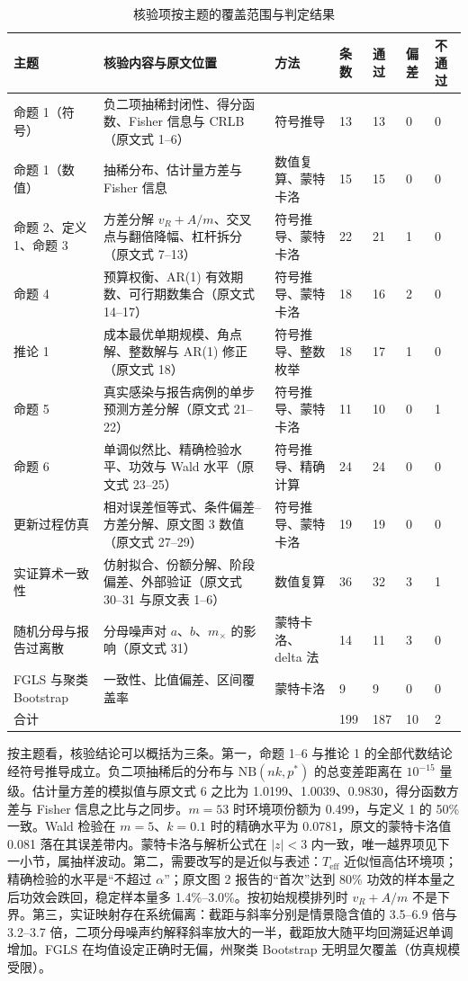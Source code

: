 \begin{table}[!tbp]
\centering
\small
\caption{核验项按主题的覆盖范围与判定结果}
\label{tab:ck-overview}
\setlength{\tabcolsep}{4pt}
\begin{tabular}{L{2.8cm}L{5.4cm}L{2.4cm}L{0.9cm}L{0.9cm}L{0.9cm}L{1.0cm}}
\toprule
主题 & 核验内容与原文位置 & 方法 & 条数 & 通过 & 偏差 & 不通过 \\
\midrule
命题 1（符号） & 负二项抽稀封闭性、得分函数、Fisher 信息与 CRLB（原文式 1--6） & 符号推导 & 13 & 13 & 0 & 0 \\
命题 1（数值） & 抽稀分布、估计量方差与 Fisher 信息 & 数值复算、蒙特卡洛 & 15 & 15 & 0 & 0 \\
命题 2、定义 1、命题 3 & 方差分解 $v_R+A/m$、交叉点与翻倍降幅、杠杆拆分（原文式 7--13） & 符号推导、蒙特卡洛 & 22 & 21 & 1 & 0 \\
命题 4 & 预算权衡、AR(1) 有效期数、可行期数集合（原文式 14--17） & 符号推导、蒙特卡洛 & 18 & 16 & 2 & 0 \\
推论 1 & 成本最优单期规模、角点解、整数解与 AR(1) 修正（原文式 18） & 符号推导、整数枚举 & 18 & 17 & 1 & 0 \\
命题 5 & 真实感染与报告病例的单步预测方差分解（原文式 21--22） & 符号推导、蒙特卡洛 & 11 & 10 & 0 & 1 \\
命题 6 & 单调似然比、精确检验水平、功效与 Wald 水平（原文式 23--25） & 符号推导、精确计算 & 24 & 24 & 0 & 0 \\
更新过程仿真 & 相对误差恒等式、条件偏差–方差分解、原文图 3 数值（原文式 27--29） & 符号推导、蒙特卡洛 & 19 & 19 & 0 & 0 \\
实证算术一致性 & 仿射拟合、份额分解、阶段偏差、外部验证（原文式 30--31 与原文表 1--6） & 数值复算 & 36 & 32 & 3 & 1 \\
随机分母与报告过离散 & 分母噪声对 $a$、$b$、$m_\times$ 的影响（原文式 31） & 蒙特卡洛、delta 法 & 14 & 11 & 3 & 0 \\
FGLS 与聚类 Bootstrap & 一致性、比值偏差、区间覆盖率 & 蒙特卡洛 & 9 & 9 & 0 & 0 \\
\midrule
合计 & & & 199 & 187 & 10 & 2 \\
\bottomrule
\end{tabular}
\end{table}

按主题看，核验结论可以概括为三条。第一，命题 1--6 与推论 1 的全部代数结论经符号推导成立。负二项抽稀后的分布与 $\mathrm{NB}(nk,p^*)$ 的总变差距离在 $10^{-15}$ 量级。估计量方差的模拟值与原文式 6 之比为 1.0199、1.0039、0.9830，得分函数方差与 Fisher 信息之比与之同步。$m=53$ 时环境项份额为 0.499，与定义 1 的 50\% 一致。Wald 检验在 $m=5$、$k=0.1$ 时的精确水平为 0.0781，原文的蒙特卡洛值 0.081 落在其误差带内。蒙特卡洛与解析公式在 $|z|<3$ 内一致，唯一越界项见下一小节，属抽样波动。第二，需要改写的是近似与表述：$T_{\mathrm{eff}}$ 近似恒高估环境项；精确检验的水平是“不超过 $\alpha$”；原文图 2 报告的“首次”达到 80\% 功效的样本量之后功效会跌回，稳定样本量多 1.4\%--3.0\%。按初始规模排列时 $v_R+A/m$ 不是下界。第三，实证映射存在系统偏离：截距与斜率分别是情景隐含值的 3.5--6.9 倍与 3.2--3.7 倍，二项分母噪声约解释斜率放大的一半，截距放大随平均回溯延迟单调增加。FGLS 在均值设定正确时无偏，州聚类 Bootstrap 无明显欠覆盖（仿真规模受限）。


